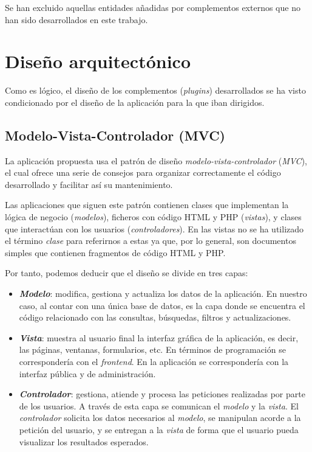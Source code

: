 
Se han excluido aquellas entidades añadidas por complementos externos que no han sido desarrollados en este trabajo.

\section{Diseño arquitectónico}

Como es lógico, el diseño de los complementos (\emph{plugins})
desarrollados se ha visto condicionado por el diseño de la aplicación
para la que iban dirigidos.


\subsection{Modelo-Vista-Controlador (MVC)}

La aplicación propuesta usa el patrón de diseño
\emph{modelo-vista-controlador} (\emph{MVC}), el cual ofrece una serie
de consejos para organizar correctamente el código desarrollado y
facilitar así su mantenimiento.

Las aplicaciones que siguen este patrón contienen clases que implementan
la lógica de negocio (\emph{modelos}), ficheros con código HTML y PHP
(\emph{vistas}), y clases que interactúan con los usuarios
(\emph{controladores}). En las vistas no se ha utilizado el término
\emph{clase} para referirnos a estas ya que, por lo general, son
documentos simples que contienen fragmentos de código HTML y PHP.

Por tanto, podemos deducir que el diseño se divide en tres capas:

\begin{itemize}
\tightlist
\item
  \textbf{\emph{Modelo}}: modifica, gestiona y actualiza los datos de la
  aplicación. En nuestro caso, al contar con una única base de datos, es
  la capa donde se encuentra el código relacionado con las consultas,
  búsquedas, filtros y actualizaciones.
\item
  \textbf{\emph{Vista}}: muestra al usuario final la interfaz gráfica de la
  aplicación, es decir, las páginas, ventanas, formularios, etc. En
  términos de programación se correspondería con el \emph{frontend}. En
  la aplicación se correspondería con la interfaz pública y de
  administración.
\item
  \textbf{\emph{Controlador}}: gestiona, atiende y procesa las peticiones
  realizadas por parte de los usuarios. A través de esta capa se
  comunican el \emph{modelo} y la \emph{vista}. El \emph{controlador}
  solicita los datos necesarios al \emph{modelo}, se manipulan acorde a
  la petición del usuario, y se entregan a la \emph{vista} de forma que
  el usuario pueda visualizar los resultados esperados.
\end{itemize}

